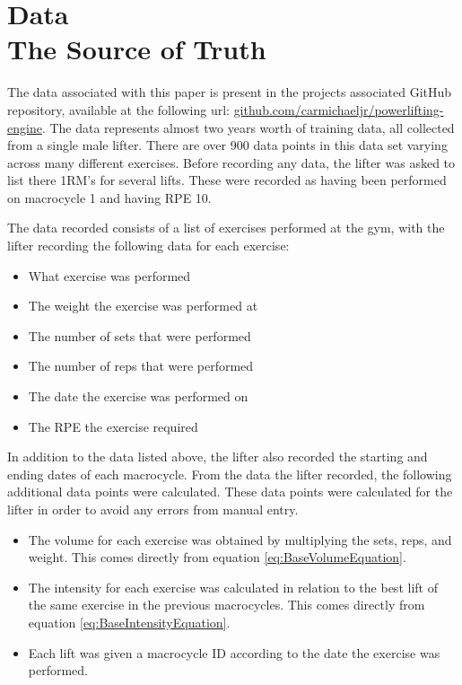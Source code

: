 \chapter{
    Data
    \\
    \large{The Source of Truth}
}
\label{sec:DataSection}

The data associated with this paper is present in the projects associated GitHub repository, available at the following url:  \url{github.com/carmichaeljr/powerlifting-engine}.
The data represents almost two years worth of training data, all collected from a single male lifter. There are over 900 data points in this data set varying across many different exercises. Before recording any data, the lifter was asked to list there 1RM's for several lifts. These were recorded as having been performed on macrocycle 1 and having RPE 10.

The data recorded consists of a list of exercises performed at the gym, with the lifter recording the following data for each exercise:

\begin{itemize}
    \item What exercise was performed
    \item The weight the exercise was performed at
    \item The number of sets that were performed
    \item The number of reps that were performed
    \item The date the exercise was performed on
    \item The RPE the exercise required
\end{itemize}

In addition to the data listed above, the lifter also recorded the starting and ending dates of each macrocycle. From the data the lifter recorded, the following additional data points were calculated. These data points were calculated for the lifter in order to avoid any errors from manual entry.

\begin{itemize}
    \item The volume for each exercise was obtained by multiplying the sets, reps, and weight. This comes directly from equation \ref{eq:BaseVolumeEquation}.
    \item The intensity for each exercise was calculated in relation to the best lift of the same exercise in the previous macrocycles. This comes directly from equation \ref{eq:BaseIntensityEquation}.
    \item Each lift was given a macrocycle ID according to the date the exercise was performed.
\end{itemize}

